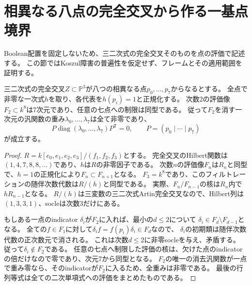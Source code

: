 \section{相異なる八点の完全交叉から作る一基点境界}
\label{sec:reduced-quadric-boundary}
Boolean配置を固定しないため、三二次式の完全交叉そのものを点の評価で記述する。
この節ではKoszul障害の普遍性を仮定せず、フレームとその適用範囲を証明する。

\begin{lemma}[七点への二次評価と非零重み]\label{lem:reduced-octad-seven-evaluation}
三二次式の完全交叉$Z\subset\mathbb P^3$が八つの相異なる点$p_0,\ldots,p_7$からなるとする。
全点で非零な一次式$h$を取り、各代表を$h(p_i)=1$と正規化する。
次数2の評価像$F_2\subset k^8$は7次元であり、任意の七点への制限は同型である。
従って$F_2$を消す一次元の汎関数の重み$\lambda_0,\ldots,\lambda_7$は全て非零であり、
\[
 P\operatorname{diag}(\lambda_0,\ldots,\lambda_7)P^{\mathsf T}=0,
 \qquad P=(p_0\mid\cdots\mid p_7)
\]
が成立する。
\end{lemma}
\begin{proof}
$R=k[e_0,e_1,e_2,e_3]/(f_1,f_2,f_3)$とする。
完全交叉のHilbert関数は$(1,4,7,8,8,\ldots)$であり、$h$は$R$の非零因子である。
次数$n$の評価像$F_n$は$R_n$と同型で、$h=1$の正規化により$F_n\subset F_{n+1}$となる。
$F_3=k^8$であり、このフィルトレーションの随伴次数代数は$R/(h)$と同型である。
実際、$F_n/F_{n-1}$の核は$R_n$内で$hR_{n-1}$となる。
$R/(h)$は三変数の三二次式Artin完全交叉なので、Hilbert列は$(1,3,3,1)$、socleは次数3だけにある。

もしある一点のindicator $\delta_i$が$F_2$に入れば、最小の$d\leq2$について
$\delta_i\in F_d\setminus F_{d-1}$となる。
全ての$f\in F_1$に対して$\delta_if=f(p_i)\delta_i\in F_d$なので、
$\delta_i$の初期類は随伴次数代数の正次数元で消される。
これは次数$d\leq2$に非零socleを与え、矛盾する。
従って$\delta_i\notin F_2$である。
任意の七点へ制限した評価の核は、欠けた点のindicatorの倍だけなので零であり、次元7から同型となる。
$F_2$の唯一の消去汎関数が一点で重み零なら、そのindicatorが$F_2$に入るため、全重みは非零である。
最後の行列等式は全ての二次単項式への評価をまとめたものである。
\end{proof}

